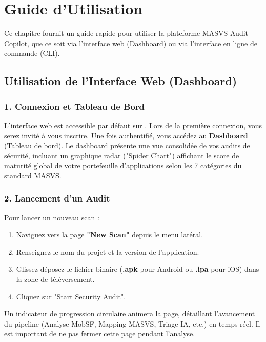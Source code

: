 \chapter{Guide d'Utilisation}
\label{chap:guide}

Ce chapitre fournit un guide rapide pour utiliser la plateforme MASVS Audit Copilot, que ce soit via l'interface web (Dashboard) ou via l'interface en ligne de commande (CLI).

\section{Utilisation de l'Interface Web (Dashboard)}

\subsection{1. Connexion et Tableau de Bord}
L'interface web est accessible par défaut sur .
Lors de la première connexion, vous serez invité à vous inscrire. Une fois authentifié, vous accédez au \textbf{Dashboard} (Tableau de bord).
Le dashboard présente une vue consolidée de vos audits de sécurité, incluant un graphique radar ("Spider Chart") affichant le score de maturité global de votre portefeuille d'applications selon les 7 catégories du standard MASVS.

\subsection{2. Lancement d'un Audit}
Pour lancer un nouveau scan :
\begin{enumerate}
    \item Naviguez vers la page \textbf{"New Scan"} depuis le menu latéral.
    \item Renseignez le nom du projet et la version de l'application.
    \item Glissez-déposez le fichier binaire (\textbf{.apk} pour Android ou \textbf{.ipa} pour iOS) dans la zone de téléversement.
    \item Cliquez sur "Start Security Audit".
\end{enumerate}
Un indicateur de progression circulaire animera la page, détaillant l'avancement du pipeline (Analyse MobSF, Mapping MASVS, Triage IA, etc.) en temps réel. Il est important de ne pas fermer cette page pendant l'analyse.

